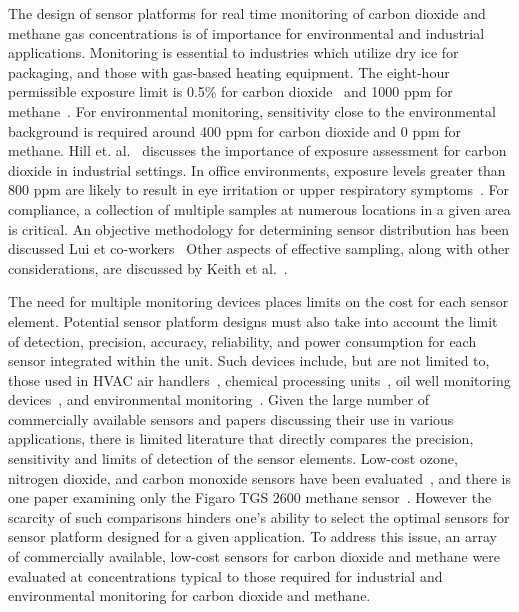 \documentclass[times]{joehreview}
\begin{document}
	The design of sensor platforms for real time monitoring of carbon dioxide and methane gas concentrations is of importance for environmental and industrial applications. Monitoring is essential to industries which utilize dry ice for packaging, and those with gas-based heating equipment.  The eight-hour permissible exposure limit is 0.5\% for carbon dioxide~\cite{centersfordiseasecontrolCentersDiseaseControl2016} and 1000 ppm for methane~\cite{centersfordiseasecontrolCentersDiseaseControl2015}.  For environmental monitoring, sensitivity close to the environmental background is required around 400 ppm for carbon dioxide and 0 ppm for methane.  Hill et. al.~\cite{ exposure_assessment} discusses the importance of exposure assessment for carbon dioxide in industrial settings.  In office environments, exposure levels greater than 800 ppm are likely to result in eye irritation or upper respiratory symptoms~\cite{sick_building}.  For compliance, a collection of multiple samples at numerous locations in a given area is critical.  An objective methodology for determining sensor distribution has been discussed Lui et co-workers~\cite{airquality_network}  Other aspects of effective sampling, along with other considerations, are discussed by Keith et al.~\cite{keith_principles_1983}.
	
	The need for multiple monitoring devices places limits on the cost for each sensor element.  Potential sensor platform designs must also take into account the limit of detection, precision, accuracy, reliability, and power consumption for each sensor integrated within the unit.  Such devices include, but are not limited to, those used in HVAC air handlers~\cite{yang_systematic_2014,chung_selective_2008}, chemical processing units~\cite{won_nonlinear_2012}, oil well monitoring devices~\cite{yi_remote_2010,somov_deployment_2013}, and environmental monitoring~\cite{pering_high_2014,black_formation_2012,guohua_study_2012,karunanithi_performance_2009,shendell_outdoor_2012}.  Given the large number of commercially available sensors and papers discussing their use in various applications, there is limited literature that directly compares the precision, sensitivity and limits of detection of the sensor elements.  Low-cost ozone, nitrogen dioxide, and carbon monoxide sensors have been evaluated~\cite{low_cost}, and there is one paper examining only the Figaro TGS 2600 methane sensor~\cite{eugster_performance_2012}.  However the scarcity of such comparisons hinders one's ability to select the optimal sensors for sensor platform designed for a given application.  To address this issue, an array of commercially available, low-cost sensors for carbon dioxide and methane were evaluated at concentrations typical to those required for industrial and environmental monitoring for carbon dioxide and methane.
	
\end{document}
